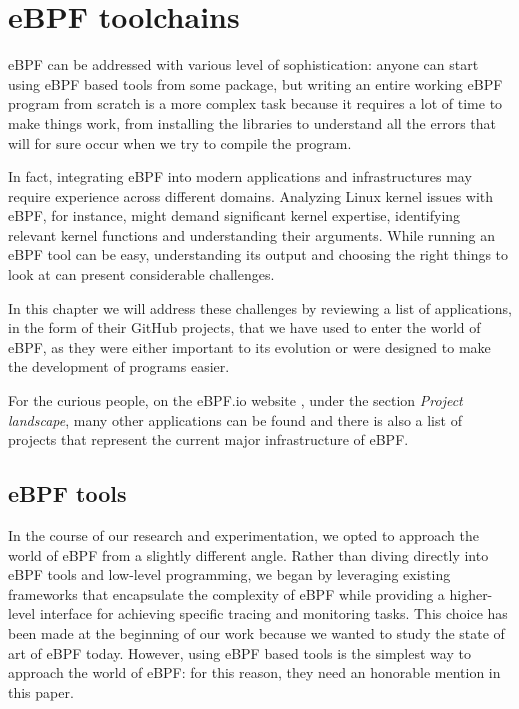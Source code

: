 \chapter{eBPF toolchains}

eBPF can be addressed with various level of sophistication: anyone can start using eBPF based tools from some package, but writing an entire working eBPF program from scratch is a more complex task because it requires a lot of time to make things work, from installing the libraries to understand all the errors that will for sure occur when we try to compile the program.

In fact, integrating eBPF into modern applications and infrastructures may require experience across different domains. 
Analyzing Linux kernel issues with eBPF, for instance, might demand significant kernel expertise, identifying relevant kernel functions and understanding their arguments.
While running an eBPF tool can be easy, understanding its output and choosing the right things to look at can present considerable challenges.

In this chapter we will address these challenges by reviewing a list of applications, in the form of their GitHub projects, that we have used to enter the world of eBPF, as they were either important to its evolution or were designed to make the development of programs easier.

For the curious people, on the eBPF.io website \cite{eBPFioWebsite}, under the section \textit{Project landscape}, many other applications can be found and there is also a list of projects that represent the current major infrastructure of eBPF.

\section{eBPF tools}

In the course of our research and experimentation, we opted to approach the world of eBPF from a slightly different angle. 
Rather than diving directly into eBPF tools and low-level programming, we began by leveraging existing frameworks that encapsulate the complexity of eBPF while providing a higher-level interface for achieving specific tracing and monitoring tasks.
This choice has been made at the beginning of our work because we wanted to study the state of art of eBPF today.
However, using eBPF based tools is the simplest way to approach the world of eBPF: for this reason, they need an honorable mention in this paper.

